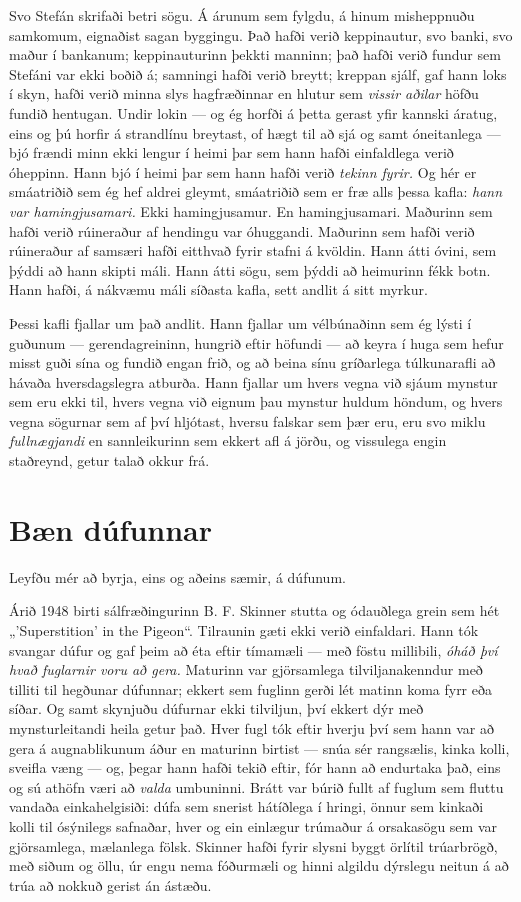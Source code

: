 Svo Stefán skrifaði betri sögu. Á árunum sem fylgdu, á hinum misheppnuðu samkomum, eignaðist sagan byggingu. Það hafði verið keppinautur, svo banki, svo maður í bankanum; keppinauturinn þekkti manninn; það hafði verið fundur sem Stefáni var ekki boðið á; samningi hafði verið breytt; kreppan sjálf, gaf hann loks í skyn, hafði verið minna slys hagfræðinnar en hlutur sem \emph{vissir aðilar} höfðu fundið hentugan. Undir lokin — og ég horfði á þetta gerast yfir kannski áratug, eins og þú horfir á strandlínu breytast, of hægt til að sjá og samt óneitanlega — bjó frændi minn ekki lengur í heimi þar sem hann hafði einfaldlega verið óheppinn. Hann bjó í heimi þar sem hann hafði verið \emph{tekinn fyrir.} Og hér er smáatriðið sem ég hef aldrei gleymt, smáatriðið sem er fræ alls þessa kafla: \emph{hann var hamingjusamari.} Ekki hamingjusamur. En hamingjusamari. Maðurinn sem hafði verið rúineraður af hendingu var óhuggandi. Maðurinn sem hafði verið rúineraður af samsæri hafði eitthvað fyrir stafni á kvöldin. Hann átti óvini, sem þýddi að hann skipti máli. Hann átti sögu, sem þýddi að heimurinn fékk botn. Hann hafði, á nákvæmu máli síðasta kafla, sett andlit á sitt myrkur.

Þessi kafli fjallar um það andlit. Hann fjallar um vélbúnaðinn sem ég lýsti í guðunum — gerendagreininn, hungrið eftir höfundi — að keyra í huga sem hefur misst guði sína og fundið engan frið, og að beina sínu gríðarlega túlkunarafli að hávaða hversdagslegra atburða. Hann fjallar um hvers vegna við sjáum mynstur sem eru ekki til, hvers vegna við eignum þau mynstur huldum höndum, og hvers vegna sögurnar sem af því hljótast, hversu falskar sem þær eru, eru svo miklu \emph{fullnægjandi} en sannleikurinn sem ekkert afl á jörðu, og vissulega engin staðreynd, getur talað okkur frá.

\section*{Bæn dúfunnar}

Leyfðu mér að byrja, eins og aðeins sæmir, á dúfunum.

Árið 1948 birti sálfræðingurinn B. F. Skinner stutta og ódauðlega grein sem hét „'Superstition' in the Pigeon“. Tilraunin gæti ekki verið einfaldari. Hann tók svangar dúfur og gaf þeim að éta eftir tímamæli — með föstu millibili, \emph{óháð því hvað fuglarnir voru að gera.} Maturinn var gjörsamlega tilviljanakenndur með tilliti til hegðunar dúfunnar; ekkert sem fuglinn gerði lét matinn koma fyrr eða síðar. Og samt skynjuðu dúfurnar ekki tilviljun, því ekkert dýr með mynsturleitandi heila getur það. Hver fugl tók eftir hverju því sem hann var að gera á augnablikunum áður en maturinn birtist — snúa sér rangsælis, kinka kolli, sveifla væng — og, þegar hann hafði tekið eftir, fór hann að endurtaka það, eins og sú athöfn væri að \emph{valda} umbuninni. Brátt var búrið fullt af fuglum sem fluttu vandaða einkahelgisiði: dúfa sem snerist hátíðlega í hringi, önnur sem kinkaði kolli til ósýnilegs safnaðar, hver og ein einlægur trúmaður á orsakasögu sem var gjörsamlega, mælanlega fölsk. Skinner hafði fyrir slysni byggt örlítil trúarbrögð, með siðum og öllu, úr engu nema fóðurmæli og hinni algildu dýrslegu neitun á að trúa að nokkuð gerist án ástæðu.

